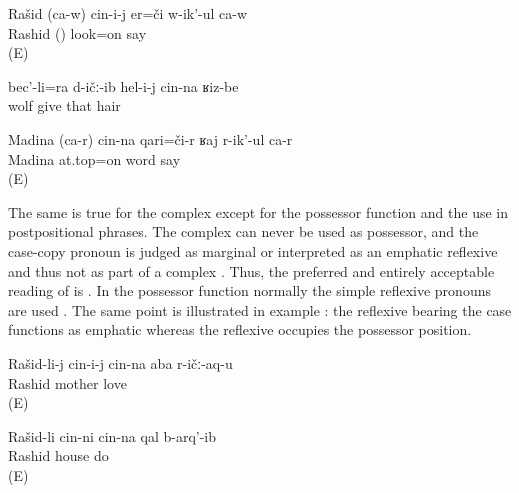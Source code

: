 \begin{exe}
	\ex	\label{ex:Rashid is looking at himselfA}
	\gll	Rašid	(ca-w)	cin-i-j	er=či	w-ik'-ul	ca-w\\
		Rashid	()		look=on	say	\\
	\glt	{} (E)

	\ex	\label{ex:‎‎‎The wolf gave him also his hair}
	\gll	bec'-li=ra	d-ičː-ib	hel-i-j	cin-na	ʁiz-be\\
		wolf	give	that		hair\\
	\glt	{}

	\ex	\label{ex:Madina is talking about herself}
	\gll	Madina	(ca-r)	cin-na	qari=či-r	ʁaj	r-ik'-ul	ca-r\\
		Madina			at.top=on	word	say	\\
	\glt	{} (E)
\end{exe}

The same is true for the complex  except for the possessor function and the use in postpositional phrases. The complex  can never be used as possessor, and the case-copy pronoun is judged as marginal or interpreted as an emphatic reflexive and thus not as part of a complex . Thus, the preferred and entirely acceptable reading of  is . In the possessor function normally the simple reflexive pronouns are used . The same point is illustrated in example : the reflexive bearing the  case functions as emphatic  whereas the  reflexive occupies the possessor position.

\begin{exe}
	\ex	\label{ex:Rashid loves his mother}
		Rašid-li-j	cin-i-j	cin-na	aba	r-ičː-aq-u\\
		{}	Rashid			mother	love\\
	\glt	{} (E)

	\ex	\label{ex:Rashid himself / alone built his house}
	\gll	Rašid-li	cin-ni	cin-na	qal	b-arq'-ib\\
		Rashid			house	do\\
	\glt	{} (E)
\end{exe}

